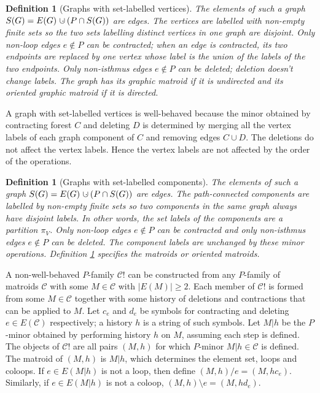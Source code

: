 \documentclass[12pt,leqno]{amsart}
\newtheorem{definition}[lem]{Definition}
\theoremstyle{remark}
\newcommand{\dunion}
{\mbox{\hbox{\hskip6pt$\cdot$\hskip-5.50pt$\cup$\hskip2pt}}}
\begin{document}
\begin{definition}[Graphs with set-labelled vertices]
\label{GSLVDefinition}
The elements of such a graph $S(G)=E(G)\dunion(P\cap S(G))$ are edges.
The vertices are labelled with non-empty
finite sets so the two sets labelling distinct vertices in one
graph are disjoint.  Only non-loop edges $e\not\in P$
can be contracted; when an edge is contracted, its two endpoints
are replaced by one vertex whose label is the union of the 
labels of the two endpoints.  Only non-isthmus edges $e\not\in P$
can be deleted; deletion doesn't change labels.  The graph
has its graphic matroid if it is undirected and its
oriented graphic matroid if it is directed.
\end{definition}

A graph with set-labelled vertices is well-behaved because
the minor obtained  by contracting forest $C$
and deleting $D$ is determined by merging all the vertex labels
of each graph component of $C$ and removing edges $C\cup D$.  
The deletions do not affect the vertex labels.  Hence
the vertex labels are not affected by the order
of the operations.


\begin{definition}[Graphs with set-labelled components]
\label{GSLCDefinition}
The elements of such a graph $S(G)=E(G)\dunion(P\cap S(G))$ are edges.
The path-connected components are labelled by
non-empty finite sets so two components in the same
graph always have disjoint labels.  In other words,
the set labels of the components are a partition $\pi_V$.
Only non-loop edges $e\not\in P$
can be contracted and only non-isthmus edges 
$e\not\in P$
can be deleted.
The component labels are unchanged by these minor operations.
Definition \ref{GSLVDefinition} specifies the
matroids or oriented matroids.
\end{definition}


A non-well-behaved $P$-family $\mathcal{C}!$
can be constructed from
any $P$-family of matroids $\mathcal{C}$ with
some $M\in\mathcal{C}$ with $|E(M)|\geq 2$.  
Each member of $\mathcal{C}!$ is formed from
some $M\in\mathcal{C}$ together with some
history of deletions and contractions that
can be applied to $M$.  Let $c_e$ and $d_e$ be symbols
for contracting and deleting $e\in E(\mathcal{C})$
respectively; a history $h$ is a string of
such symbols.  
Let $M|h$ be the $P$-minor obtained by 
performing history $h$ on $M$, assuming each step
is defined.  The objects of $\mathcal{C}!$
are all pairs $(M,h)$ for which 
$P$-minor $M|h\in\mathcal{C}$ is defined.
The matroid of $(M,h)$ is $M|h$, which
determines the element set, loops and coloops.
If $e\in E(M|h)$ is not
a loop, then define $(M,h)/e=(M,hc_e)$.
Similarly, if $e\in E(M|h)$ is not
a coloop, $(M,h)\setminus e=(M,hd_e)$.
\end{document}
